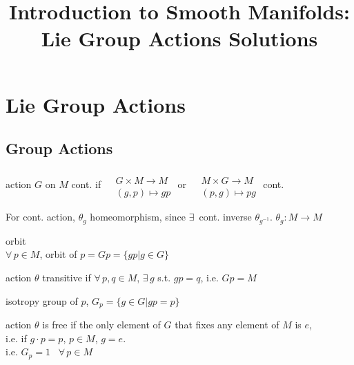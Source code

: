 \documentclass[11pt]{amsart}
\title{Introduction to Smooth Manifolds: Lie Group Actions Solutions}
\theoremstyle{definition}
\begin{document}
\maketitle
\section{Lie Group Actions}

\subsection{ Group Actions }

action $G$ on $M$ cont. if $\begin{aligned} & \quad \\ & G \times M \to M \\ & (g,p) \mapsto gp \end{aligned}$ or $\begin{aligned} & \quad \\ & M \times G \to M \\ & (p,g) \mapsto pg \end{aligned}$ cont.

For cont. action, $\theta_g$ homeomorphism, since $\exists \, $ cont. inverse $\theta_{g^{-1}}$.  $\theta_g : M \to M$

orbit \\
$\forall \, p \in M$, orbit of $p = Gp = \lbrace gp | g \in G \rbrace$

action $\theta$ transitive if $\forall \, p, q \in M$, $\exists \, g$ s.t. $gp = q$, i.e. $Gp = M$

isotropy group of $p$, $G_p = \lbrace g \in G | gp = p \rbrace$

action $\theta$ is free if the only element of $G$ that fixes any element of $M$ is $e$, \\
i.e. if $g \cdot p = p$, $ p \in M$, $g=e$.  \\
i.e. $G_p = 1$ \, $\forall \, p \in M$
\end{document}
